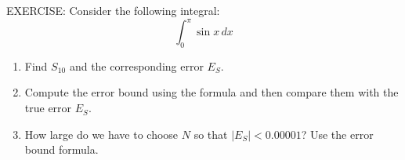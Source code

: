 \documentclass[11pt]{article}
\begin{document}
\vspace{5in}
EXERCISE:
Consider the following integral:
\begin{displaymath}
\int_0^{\pi}\sin{x} \,dx 
\end{displaymath}
\begin{enumerate}
\item{Find $S_{10}$ and the corresponding error $E_S$.}
\item{Compute the error bound using the formula and then compare them with the true error $E_S$.}
\item{How large do we have to choose $N$ so that $|E_S| < 0.00001$?  Use the error bound formula.}
\end{enumerate}
\end{document}
